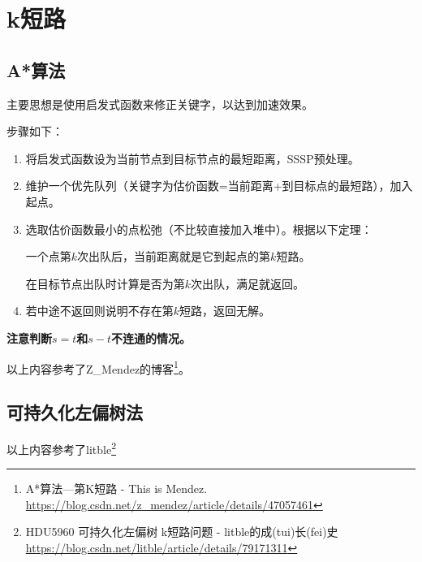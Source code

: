 \section{k短路}
\subsection{A*算法}
主要思想是使用启发式函数来修正关键字，以达到加速效果。

步骤如下：

\begin{enumerate}
    \item 将启发式函数设为当前节点到目标节点的最短距离，SSSP预处理。
    \item 维护一个优先队列（关键字为估价函数=当前距离+到目标点的最短路），加入起点。
    \item 选取估价函数最小的点松弛（不比较直接加入堆中）。根据以下定理：
    \begin{theorem}
        一个点第$k$次出队后，当前距离就是它到起点的第$k$短路。
    \end{theorem}
    在目标节点出队时计算是否为第$k$次出队，满足就返回。
    \item 若中途不返回则说明不存在第$k$短路，返回无解。
\end{enumerate}
{\bfseries 注意判断$s=t$和$s-t$不连通的情况。}

以上内容参考了Z\_Mendez的博客\footnote{A*算法—第K短路 - This is Mendez.
    \url{https://blog.csdn.net/z\_mendez/article/details/47057461}
}。
\subsection{可持久化左偏树法}

以上内容参考了litble\footnote{HDU5960 可持久化左偏树 k短路问题 - litble的成(tui)长(fei)史
    \url{https://blog.csdn.net/litble/article/details/79171311}
}
